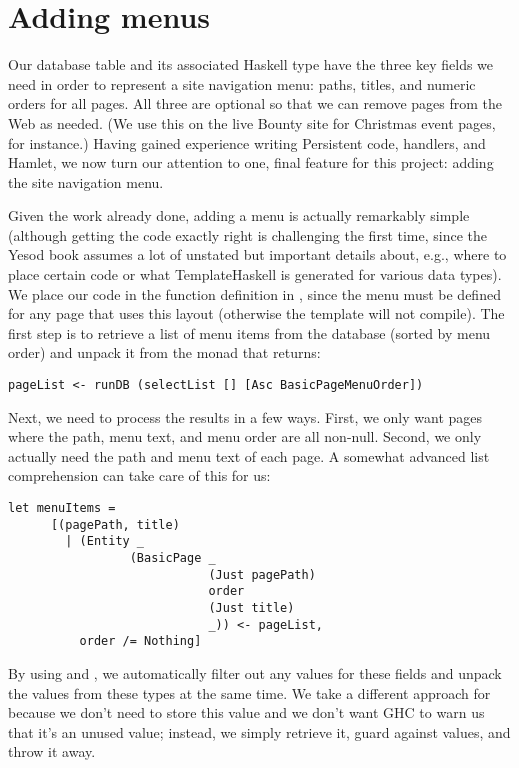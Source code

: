 \section{Adding menus}

Our  database table and its associated Haskell type have the three key fields we need in order to represent a site navigation menu: paths, titles, and numeric orders for all pages. All three are optional so that we can remove pages from the Web as needed. (We use this on the live Bounty site for Christmas event pages, for instance.) Having gained experience writing Persistent code, handlers, and Hamlet, we now turn our attention to one, final feature for this project: adding the site navigation menu.

Given the work already done, adding a menu is actually remarkably simple (although getting the code exactly right is challenging the first time, since the Yesod book assumes a lot of unstated but important details about, e.g., where to place certain code or what TemplateHaskell is generated for various data types). We place our code in the  function definition in , since the menu must be defined for any page that uses this layout (otherwise the template will not compile). The first step is to retrieve a list of menu items from the database (sorted by menu order) and unpack it from the monad that  returns:

\begin{Verbatim}[samepage=true]
pageList <- runDB (selectList [] [Asc BasicPageMenuOrder])
\end{Verbatim}

Next, we need to process the results in a few ways. First, we only want pages where the path, menu text, and menu order are all non-null. Second, we only actually need the path and menu text of each page. A somewhat advanced list comprehension can take care of this for us:

\begin{Verbatim}[samepage=true]
let menuItems = 
      [(pagePath, title) 
        | (Entity _ 
                 (BasicPage _ 
                            (Just pagePath) 
                            order
                            (Just title) 
                            _)) <- pageList,
          order /= Nothing]
\end{Verbatim}

By using  and , we automatically filter out any  values for these fields and unpack the values from these  types at the same time. We take a different approach for  because we don't need to store this value and we don't want GHC to warn us that it's an unused value; instead, we simply retrieve it, guard against  values, and throw it away.

